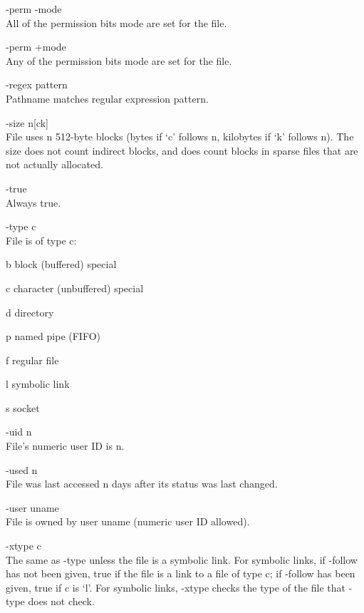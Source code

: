 \begin{description}
       -perm -mode \\
              All  of  the  permission  bits mode are set for the
              file.

       -perm +mode \\
              Any of the permission bits mode  are  set  for  the
              file.

       -regex pattern \\
              Pathname matches regular expression pattern.

       -size n[ck] \\
              File  uses  n 512-byte blocks (bytes if `c' follows
              n, kilobytes if `k' follows n).  The size does  not
              count  indirect  blocks,  and  does count blocks in
              sparse files that are not actually allocated.

       -true   \\
              Always true.

       -type c \\
              File is of type c:

              b      block (buffered) special

              c      character (unbuffered) special

              d      directory

              p      named pipe (FIFO)

              f      regular file

              l      symbolic link

              s      socket

       -uid n  \\
              File's numeric user ID is n.

       -used n \\
              File was last accessed n days after its status  was
              last changed.

       -user uname \\
              File  is  owned  by  user  uname  (numeric  user ID
              allowed).

       -xtype c \\
              The same as -type unless the  file  is  a  symbolic
              link.   For symbolic links, if -follow has not been
              given, true if the file is a link to a file of type
              c;  if  -follow  has  been given, true if c is `l'.
              For symbolic links, -xtype checks the type  of  the
              file that -type does not check.


\end{description}
